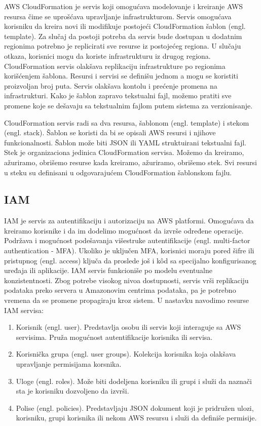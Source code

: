 \documentclass[12pt,oneside]{memoir}
\begin{document}
AWS CloudFormation je servis koji omogućava modelovanje i kreiranje AWS resursa čime se uprošćava upravljanje infrastrukturom. Servis omogućava korisniku da kreira novi ili modifikuje postojeći CloudFormation šablon (engl. template). Za slučaj da postoji potreba da servis bude dostupan u dodatnim regionima potrebno je replicirati sve resurse iz postojećeg regiona. U slučaju otkaza, korisnici mogu da koriste infrastrukturu iz drugog regiona. CloudFormation servis olakšava replikaciju infrastrukture po regionima korišćenjem šablona. Resursi i servisi se definišu jednom a mogu se koristiti proizvoljan broj puta. Servis olakšava kontolu i prećenje promena na infrastrukturi. Kako je šablon zapravo tekstualni fajl, možemo pratiti sve promene koje se dešavaju sa tekstualnim fajlom putem sistema za verzionisanje.
 
CloudFormation servis radi sa dva resursa, šablonom (engl. template) i stekom (engl. stack). Šablon se koristi da bi se opisali AWS resursi i njihove funkcionalnosti. Šablon može biti JSON ili YAML struktuirani tekstualni fajl. Stek je organizaciona jedinica CloudFormation servisa. Možemo da kreiramo, ažuriramo, obrišemo resurse kada kreiramo, ažuriramo, obrišemo stek. Svi resursi u steku su definisani u odgovarajućem CloudFormation šablonskom fajlu.
 
\subsection{IAM}
 
IAM je servis za autentifikaciju i autorizaciju na AWS platformi. Omogućava da kreiramo korisnike i da im dodelimo mogućnost da izvrše određene operacije. Podržava i mogućnost podešavanja višestruke autentifikacije (engl. multi-factor authentication - MFA). Ukoliko je uključen MFA, korisnici moraju pored šifre ili pristupnog (engl. access) ključa da proslede još i kôd sa specijalno konfigurisanog uređaja ili aplikacije. IAM servis funkcioniše po modelu eventualne konzistentnosti. Zbog potrebe visokog nivoa dostupnosti, servis vrši replikaciju podataka preko servera u Amazonovim centrima podataka, pa je potrebno vremena da se promene propagiraju kroz sistem. U nastavku navodimo resurse IAM servisa:
\begin{enumerate}
  \item Korisnik (engl. user). Predstavlja osobu ili servis koji interaguje sa AWS servisima. Pruža mogućnost autentifikacije korisnika ili servisa.
  \item Korisnička grupa (engl. user groups). Kolekcija korisnika koja olakšava upravljanje permisijama korsnika.
  \item Uloge (engl. roles). Može biti dodeljena korisniku ili grupi i služi da naznači sta je korisniku dozvoljeno da izvrši.
  \item Polise (engl. policies). Predstavljaju JSON dokument koji je pridružen ulozi, korisniku, grupi korisnika ili nekom AWS resursu i služi da definiše permisije.
\end{enumerate}
\end{document}

